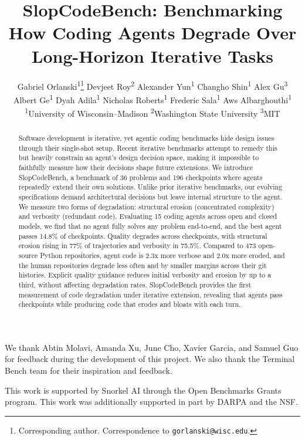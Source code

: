 \documentclass{article}
\title{SlopCodeBench: Benchmarking How Coding Agents Degrade Over Long-Horizon Iterative Tasks}
\author{
  Gabriel Orlanski\textsuperscript{1}\thanks{Corresponding author. Correspondence to \texttt{gorlanski@wisc.edu}.} \And
  Devjeet Roy\textsuperscript{2} \And
  Alexander Yun\textsuperscript{1} \And
  Changho Shin\textsuperscript{1} \And
  Alex Gu\textsuperscript{3} \And
  Albert Ge\textsuperscript{1} \And
  Dyah Adila\textsuperscript{1} \And
  Nicholas Roberts\textsuperscript{1} \And
  Frederic Sala\textsuperscript{1} \And
  Aws Albarghouthi\textsuperscript{1} \AND
  \normalfont\textsuperscript{1}University of Wisconsin--Madison \quad
  \textsuperscript{2}Washington State University \quad
  \textsuperscript{3}MIT
}
\begin{document}
\maketitle

\begin{abstract}
Software development is iterative, yet agentic coding benchmarks hide design issues through their single-shot setup.
%
Recent iterative benchmarks attempt to remedy this but heavily constrain an agent's design decision space, making it impossible to faithfully measure how their decisions shape future extensions.
%
We introduce SlopCodeBench, a benchmark of 36 problems and 196 checkpoints where agents repeatedly extend their own solutions. Unlike prior iterative benchmarks, our evolving specifications demand architectural decisions but leave internal structure to the agent.
%
We measure two forms of degradation: structural erosion (concentrated complexity) and verbosity (redundant code).
%
Evaluating 15 coding agents across open and closed models, we find that no agent fully solves any problem end-to-end, and the best agent passes 14.8\% of checkpoints.
%
Quality degrades across checkpoints, with structural erosion rising in 77\% of trajectories and verbosity in 75.5\%.
%
Compared to 473 open-source Python repositories, agent code is 2.3x more verbose and 2.0x more eroded, and the human repositories degrade less often and by smaller margins across their git histories.
%
Explicit quality guidance reduces initial verbosity and erosion by up to a third, without affecting degradation rates.
%
SlopCodeBench provides the first measurement of code degradation under iterative extension, revealing that agents pass checkpoints while producing code that erodes and bloats with each turn.
\end{abstract}





% 


\begin{ack}
We thank Abtin Molavi, Amanda Xu, June Cho, Xavier Garcia, and Samuel Guo for feedback during the development of this project. We also thank the Terminal Bench team for their inspiration and feedback.

This work is supported by Snorkel AI through the Open Benchmarks Grants program. This work was additionally supported in part by DARPA and the NSF.
\end{ack}



\appendix
% 






\end{document}
